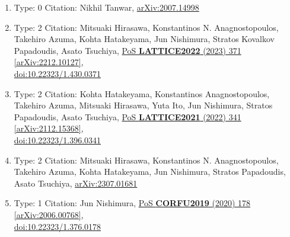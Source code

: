 \documentclass[a4paper,10pt]{article}
\begin{document}
\begin{enumerate}
\begin{enumerate}
  \item Type: 0 Citation: Nikhil Tanwar, \href{https://arxiv.org/abs/2007.14998}{arXiv:2007.14998}
  \item Type: 2 Citation: Mitsuaki Hirasawa, Konstantinos N. Anagnostopoulos, Takehiro Azuma, Kohta Hatakeyama, Jun Nishimura, Stratos Kovalkov Papadoudis, Asato Tsuchiya, \href{https://www.doi.org/10.22323/1.430.0371}{PoS {\bf LATTICE2022} (2023) 371}  \href{https://arxiv.org/abs/2212.10127}{[arXiv:2212.10127]},\\\href{https://www.doi.org/10.22323/1.430.0371}{doi:10.22323/1.430.0371}
  \item Type: 2 Citation: Kohta Hatakeyama, Konstantinos Anagnostopoulos, Takehiro Azuma, Mitsuaki Hirasawa, Yuta Ito, Jun Nishimura, Stratos Papadoudis, Asato Tsuchiya, \href{https://www.doi.org/10.22323/1.396.0341}{PoS {\bf LATTICE2021} (2022) 341}  \href{https://arxiv.org/abs/2112.15368}{[arXiv:2112.15368]},\\\href{https://www.doi.org/10.22323/1.396.0341}{doi:10.22323/1.396.0341}
  \item Type: 2 Citation: Mitsuaki Hirasawa, Konstantinos N. Anagnostopoulos, Takehiro Azuma, Kohta Hatakeyama, Jun Nishimura, Stratos Papadoudis, Asato Tsuchiya, \href{https://arxiv.org/abs/2307.01681}{arXiv:2307.01681}
  \item Type: 1 Citation: Jun Nishimura, \href{https://www.doi.org/10.22323/1.376.0178}{PoS {\bf CORFU2019} (2020) 178}  \href{https://arxiv.org/abs/2006.00768}{[arXiv:2006.00768]},\\\href{https://www.doi.org/10.22323/1.376.0178}{doi:10.22323/1.376.0178}

\end{enumerate}
\end{enumerate}
\end{document}
